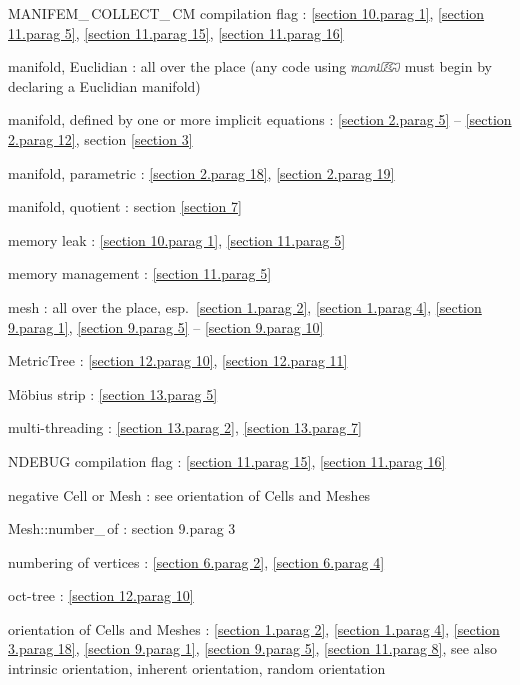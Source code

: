 \documentclass[a4paper]{scrreprt}
\def\numb{}
\newcommand\maniFEM{\leavevmode\hbox{\includegraphics[width=13mm]{manifem-small}}}
\newcommand\verm[1]{\textcolor{manif}{#1}}
\renewcommand\tt{\normalfont\ttfamily}
\begin{document}
\noindent
{\small\tt MANIFEM\_\,COLLECT\_\,CM} compilation flag : \ref{\numb section 10.\numb parag 1},
\ref{\numb section 11.\numb parag 5}, \ref{\numb section 11.\numb parag 15},
\ref{\numb section 11.\numb parag 16}

\noindent
manifold, Euclidian : all over the place\hfil\break
\hglue 9mm (any code using {\maniFEM} must begin by declaring a Euclidian manifold)

\noindent
manifold, defined by one or more implicit equations :
\ref{\numb section 2.\numb parag 5} -- \ref{\numb section 2.\numb parag 12},
section \ref{\numb section 3}

\noindent
manifold, parametric : \ref{\numb section 2.\numb parag 18},
\ref{\numb section 2.\numb parag 19}

\noindent
manifold, quotient : section \ref{\numb section 7}

\noindent
memory leak : \ref{\numb section 10.\numb parag 1}, \ref{\numb section 11.\numb parag 5}

\noindent
memory management : \ref{\numb section 11.\numb parag 5}

\noindent
mesh : all over the place, esp.\ \ref{\numb section 1.\numb parag 2},
\ref{\numb section 1.\numb parag 4}, \ref{\numb section 9.\numb parag 1},
\ref{\numb section 9.\numb parag 5} -- \ref{\numb section 9.\numb parag 10}

\noindent
{\small\tt \verm{MetricTree}} : \ref{\numb section 12.\numb parag 10},
\ref{\numb section 12.\numb parag 11}

\noindent
M\"obius strip : \ref{\numb section 13.\numb parag 5}

\noindent
multi-threading : \ref{\numb section 13.\numb parag 2}, \ref{\numb section 13.\numb parag 7}

\noindent
{\small\tt NDEBUG} compilation flag : \ref{\numb section 11.\numb parag 15},
\ref{\numb section 11.\numb parag 16}

\noindent
negative {\small\tt \verm{Cell}} or {\small\tt \verm{Mesh}} :
see orientation of {\small\tt \verm{Cell}}s and {\small\tt \verm{Mesh}}es

\noindent
{\small\tt\verm{Mesh}::number\_\,of} : {\numb section 9.\numb parag 3}

\noindent
numbering of vertices :
\ref{\numb section 6.\numb parag 2}, \ref{\numb section 6.\numb parag 4}

\noindent
oct-tree : \ref{\numb section 12.\numb parag 10}

\noindent
orientation of {\small\tt \verm{Cell}}s and {\small\tt \verm{Mesh}}es :
\ref{\numb section 1.\numb parag 2}, \ref{\numb section 1.\numb parag 4},
\ref{\numb section 3.\numb parag 18}, \ref{\numb section 9.\numb parag 1},
\ref{\numb section 9.\numb parag 5}, \ref{\numb section 11.\numb parag 8},\hfil\break
\hglue 9mm see also intrinsic orientation, inherent orientation, random orientation
\end{document}
